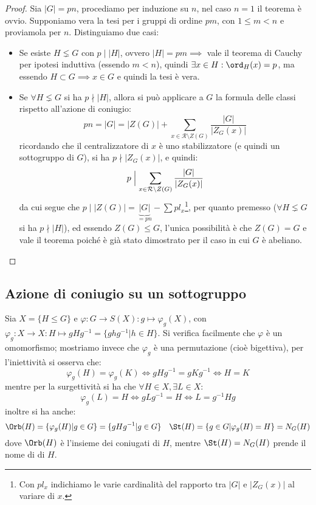 \documentclass[11pt]{scrartcl}
\begin{document}
\begin{proof}
    Sia $|G| = pn$, procediamo per induzione su $n$, nel caso $n = 1$ il teorema è ovvio. Supponiamo vera la tesi per i gruppi di ordine $pm$, con 
    $1 \leq m < n$ e proviamola per $n$. Distinguiamo due casi:
        \begin{itemize}
            \item Se esiste $H \lneq G$ con $p \mid |H|$, ovvero $|H| = pm \implies$ vale il teorema di Cauchy per ipotesi induttiva (essendo $m<n$), quindi 
            $\exists x \in H : \ord_H(x) = p$, ma essendo $H \subset G \implies x \in G$ e quindi la tesi è vera.
            \item Se $\forall H \lneq G$ si ha $p \nmid |H|$, allora si può applicare a $G$ la formula delle classi rispetto all'azione di coniugio:
                \[ pn = |G| = |Z(G)| + \sum_{x \in \mathcal{R}\setminus{Z(G)}} \frac{|G|}{|Z_G(x)|}
                    \]
                ricordando che il centralizzatore di $x$ è uno stabilizzatore (e quindi un sottogruppo di $G$), si ha $p \nmid |Z_G(x)|$, e quindi:
                    \[ p \Bigm| \sum_{x \in \mathcal{R}\setminus{Z(G)}} \frac{|G|}{|Z_G(x)|}
                        \]
                da cui segue che $p \mid |Z(G)| = \underbrace{|G|}_{= pn} - \sum pl_x$\footnote{Con $pl_x$ indichiamo le varie cardinalità del rapporto tra $|G|$ e $|Z_G(x)|$ al variare di $x$.}, per quanto premesso ($\forall H \lneq G$ si ha $p \nmid |H|$), ed essendo $Z(G) \leqslant G$, l'unica 
                possibilità è che $Z(G) = G$ e vale il teorema poiché è già stato dimostrato per il caso in cui $G$ è abeliano.
        \end{itemize}
\end{proof}

\newpage
\subsection{Azione di coniugio su un sottogruppo}
Sia $X = \{H \leqslant G\}$ e $\varphi : G \longrightarrow S(X) : g \longmapsto \varphi_g(X)$, con $\varphi_g : X \longrightarrow X : H \longmapsto gHg^{-1} = \{ghg^{-1} | h \in H\}$. 
    Si verifica facilmente che $\varphi$ è un omomorfismo; mostriamo invece che $\varphi_g$ è una permutazione (cioè bigettiva), per l'iniettività si osserva che:
        \[ \varphi_g(H) = \varphi_g(K) \iff gHg^{-1} = gKg^{-1} \iff H = K
            \]
    mentre per la surgettività si ha che $\forall H \in X, \exists L \in X$:
        \[ \varphi_g(L) = H \iff gLg^{-1} = H \iff L = g^{-1}Hg
            \]
    inoltre si ha anche:
        \[ \Orb(H) = \{\varphi_g(H) | g \in G\} = \{gHg^{-1}| g \in G\} \quad \St(H) = \{g \in G | \varphi_g(H) = H\} = N_G(H)
            \]
    dove $\Orb(H)$ è l'insieme dei coniugati di $H$, mentre $\St(H) = N_G(H)$ prende il nome di  di $H$.
\end{document}
